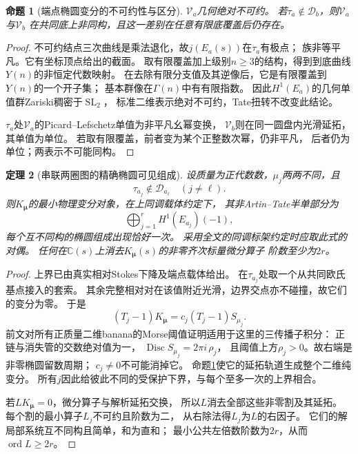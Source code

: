 \documentclass[11pt,a4paper,oneside]{ctexart}
\theoremstyle{cnplain}
\newtheorem{theorem}{定理}[section]
\newtheorem{proposition}[theorem]{命题}
\theoremstyle{definition}
\theoremstyle{remark}
\numberwithin{equation}{section}
\begin{document}
\begin{proposition}[端点椭圆变分的不可约性与区分]\label{unified:prop:seriesirred}
$\mathcal V_a$几何绝对不可约。
若$\tau_a\notin\mathcal D_b$，则$\mathcal V_a$与$\mathcal V_b$
在共同底上非同构，且这一差别在任意有限底覆盖后仍存在。
\end{proposition}
\begin{proof}
不可约结点三次曲线是乘法退化，故$j(E_a(s))$在$\tau_a$有极点；
族非等平凡。它有坐标顶点给出的截面。
取有限覆盖加上级别$n\ge3$的结构，得到到底曲线$Y(n)$的非恒定代数映射。
在去除有限分支值及其逆像后，它是有限覆盖到$Y(n)$的一个开子集；
基本群像在$\Gamma(n)$中有有限指数。
因此$H^1(E_a)$的几何单值群Zariski稠密于$\operatorname{SL}_2$，
标准二维表示绝对不可约，Tate扭转不改变此结论。

$\tau_a$处$\mathcal V_a$的Picard--Lefschetz单值为非平凡幺幂变换，
$\mathcal V_b$则在同一圆盘内光滑延拓，其单值为单位。
若取有限覆盖，前者变为某个正整数次幂，仍非平凡，
后者仍为单位；两表示不可能同构。
\end{proof}

\begin{theorem}[串联两圈图的精确椭圆可见组成]\label{unified:thm:seriesvisible}
设质量为正代数数，$\mu_j$两两不同，且
\begin{equation}\label{unified:eq:seriesseparation}
 \tau_{a_j}\notin\mathcal D_{a_\ell}\quad(j\ne\ell).
\end{equation}
则$K_{\boldsymbol\mu}$的最小物理变分对象，在上同调载体约定下，
其非Artin--Tate半单部分为
\[
 \bigoplus_{j=1}^r H^1(E_{a_j})(-1),
\]
每个互不同构的椭圆组成出现恰好一次。
采用全文的同调标架约定时应取此式的对偶。
任何在$\mathbb C(s)$上消去$K_{\boldsymbol\mu}(s)$的非零齐次标量微分算子
阶数至少为$2r$。
\end{theorem}
\begin{proof}
上界已由真实相对Stokes下降及端点载体给出。
在$\tau_{a_j}$处取一个从共同欧氏基点接入的套索。
其余完整相对对在该值附近光滑，边界交点亦不碰撞，故它们的变分为零。
于是
\[
 (T_j-1)K_{\boldsymbol\mu}
      =c_j(T_j-1)S_{\mu_j}.
\]
前文对所有正质量二维banana的Morse阈值证明适用于这里的三传播子积分：
正链与消失管的交数绝对值为一，
$\operatorname{Disc}S_{\mu_j}=2\pi i\,\rho_j$，
且阈值上方$\rho_j>0$。故右端是非零椭圆留数周期；
$c_j\ne0$不可能消掉它。
命题\ref{unified:prop:seriesirred}使它的延拓轨道生成整个二维纯变分。
所有$j$因此给彼此不同的受保护下界，与每个至多一次的上界相合。

若$LK_{\boldsymbol\mu}=0$，微分算子与解析延拓交换，
所以$L$消去全部这些非零割及其延拓。
每个割的最小算子$L_j$不可约且阶数为二，
从右除法得$L_j$为$L$的右因子。
它们的解局部系统互不同构且简单，和为直和；
最小公共左倍数阶数为$2r$，从而$\operatorname{ord}L\ge2r$。
\end{proof}
\end{document}
